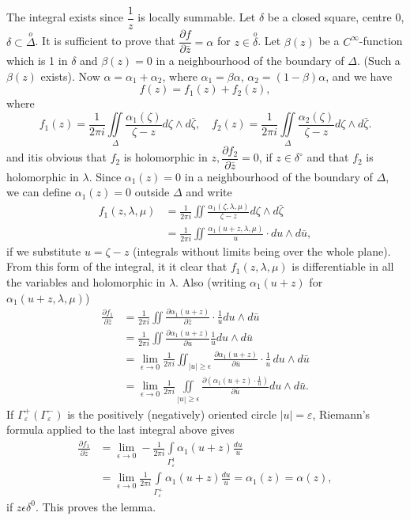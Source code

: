 \medskip
{}
The integral exists since $\dfrac{1}{z}$ is locally summable. Let
$\delta$ be a closed square, centre $0$, $\delta \subset
\overset{o}{\Delta}$. It is sufficient to prove that $\dfrac{\partial
  f}{\partial \bar{z}} = \alpha$ for $z \in \overset{o}{\delta}$. Let
$\beta(z)$ be a $C^\infty$-function which is 1 in $\delta$ and $\beta
(z) = 0$ in a neighbourhood of the boundary of $\Delta$. (Such a
$\beta(z)$ exists). Now $\alpha = \alpha_1 + \alpha_2$, where
$\alpha_1 = \beta \alpha$, $\alpha_2 = (1-\beta) \alpha$, and we have 
$$
f(z) = f_1 (z) + f_2 (z), 
$$
where 
$$
f_1 (z) = \frac{1}{2\pi i} \iint\limits_{\Delta} \frac{\alpha_1
  (\zeta)}{\zeta - z} d \zeta \wedge d \bar{\zeta}, \quad f_2(z)  =
\frac{1}{2\pi i } \iint\limits_\Delta \frac{\alpha_2(\zeta)}{\zeta-z}
d \zeta \wedge d\bar{\zeta}. 
$$
and it\pageoriginale is obvious that $f_2$ is holomorphic in $z,
\dfrac{\partial f_2}{\partial \bar{z}} = 0$, if $z \in \delta^\circ$
and that $f_2$ is holomorphic in $\lambda$. Since $\alpha_1 (z) = 0$
in  a neighbourhood of the boundary of $\Delta$, we can define
$\alpha_1 (z) = 0$ outside $\Delta$ and write 
\begin{align*}
f_1 (z, \lambda, \mu) & = \frac{1}{2\pi i } \iint \frac{\alpha_1 (\zeta,
  \lambda, \mu)}{\zeta-z} d \zeta \wedge d \bar{\zeta}\\
& = \frac{1}{2\pi i} \iint \frac{\alpha_1 (u + z, \lambda, \mu)}{u}
\cdot du \wedge d \bar{u}, 
\end{align*}
if we substitute $u =\zeta -z$ (integrals without limits being over
the whole plane). From this form of the integral, it it clear that
$f_1(z, \lambda, \mu)$ is differentiable in all the variables and
holomorphic in $\lambda$. Also (writing $\alpha_1 (u+z)$ for $\alpha_1
(u+z, \lambda, \mu)$)
\begin{align*}
\frac{\partial f_1}{\partial \bar{z}} & = \frac{1}{2\pi i} \iint
\frac{\partial \alpha_1(u+z)}{\partial \bar{z}} \cdot \frac{1}{u}  du
\wedge d \bar{u}\\
& = \frac{1}{2 \pi i} \iint \frac{\partial \alpha_1(u+z)}{\partial
  \bar{u}} \frac{1}{u} du \wedge d\bar{u}\\
& = \lim\limits_{\epsilon\to 0} \frac{1}{2\pi i}  \iint_{|u| \geq \epsilon }
\frac{\partial \alpha_1 (u+z)}{\partial \bar{u}} \cdot \frac{1}{u}\, du
\wedge d \bar{u} \\
& = \lim\limits_{\epsilon \to 0} \frac{1}{2\pi i} \iint\limits_{|u| \geq
  \epsilon} \frac{\partial (\alpha_1(u+z) \cdot \frac{1}{u})}{\partial
  \bar{u}}  du \wedge d\bar{u}. 
\end{align*}
If $\Gamma^+_\varepsilon (\Gamma^-_{\varepsilon})$ is the positively
(negatively) oriented circle $|u| = \varepsilon$, Riemann's formula
applied to the last integral above gives
\begin{align*}
\frac{\partial f_1}{\partial\bar{z}} &= \lim\limits_{\epsilon\to 0} -
\frac{1}{2\pi i} \int\limits_{\Gamma^1_\varepsilon} \alpha_1 (u+z)
\frac{du}{u} \\
& = \lim\limits_{\epsilon \to 0} \frac{1}{2\pi i}
\int\limits_{\Gamma^+_\varepsilon} \alpha_1 (u+z) \frac{du}{u} =
\alpha_1(z) = \alpha(z),
\end{align*}
if $z \epsilon \delta^0$. This proves the lemma. 


